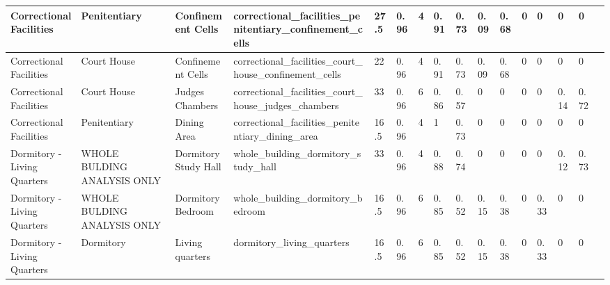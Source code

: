 \begin{center}
\begin{landscape}
\begin{longtable}{|p{0.75in}|p{0.75in}|p{0.75in}|p{0.75in}|p{0.3in}|p{0.3in}|p{0.3in}|p{0.3in}|p{0.3in}|p{0.3in}|p{0.3in}|p{0.3in}|p{0.3in}|p{0.3in}|p{0.3in}|p{0.6in}|}
      Correctional Facilities                 & Penitentiary                & Confinement Cells                               & correctional\_facilities\_penitentiary\_confinement\_cells      & 27.5 & 0.96 & 4  & 0.91   & 0.73  & 0.09  & 0.68  & 0    & 0    & 0    & 0    &                                                                                       \\ \hline
      Correctional Facilities                 & Court House                 & Confinement Cells                               & correctional\_facilities\_court\_house\_confinement\_cells      & 22   & 0.96 & 4  & 0.91   & 0.73  & 0.09  & 0.68  & 0    & 0    & 0    & 0    &                                                                                       \\ \hline
      Correctional Facilities                 & Court House                 & Judges Chambers                                 & correctional\_facilities\_court\_house\_judges\_chambers        & 33   & 0.96 & 6  & 0.86   & 0.57  & 0     & 0     & 0    & 0    & 0.14 & 0.72 &                                                                                       \\ \hline
      Correctional Facilities                 & Penitentiary                & Dining Area                                     & correctional\_facilities\_penitentiary\_dining\_area            & 16.5 & 0.96 & 4  & 1      & 0.73  & 0     & 0     & 0    & 0    & 0    & 0    &                                                                                       \\ \hline
      Dormitory - Living Quarters             & WHOLE BULDING ANALYSIS ONLY & Dormitory Study Hall                            & whole\_building\_dormitory\_study\_hall                         & 33   & 0.96 & 4  & 0.88   & 0.74  & 0     & 0     & 0    & 0    & 0.12 & 0.73 &                                                                                       \\ \hline
      Dormitory - Living Quarters             & WHOLE BULDING ANALYSIS ONLY & Dormitory Bedroom                               & whole\_building\_dormitory\_bedroom                             & 16.5 & 0.96 & 6  & 0.85   & 0.52  & 0.15  & 0.38  & 0    & 0.33 & 0    & 0    &                                                                                       \\ \hline
      Dormitory - Living Quarters             & Dormitory                   & Living quarters                                 & dormitory\_living\_quarters                                     & 16.5 & 0.96 & 6  & 0.85   & 0.52  & 0.15  & 0.38  & 0    & 0.33 & 0    & 0    &                                                                                       \\ \hline

\end{longtable}
\end{landscape}
\end{center}
